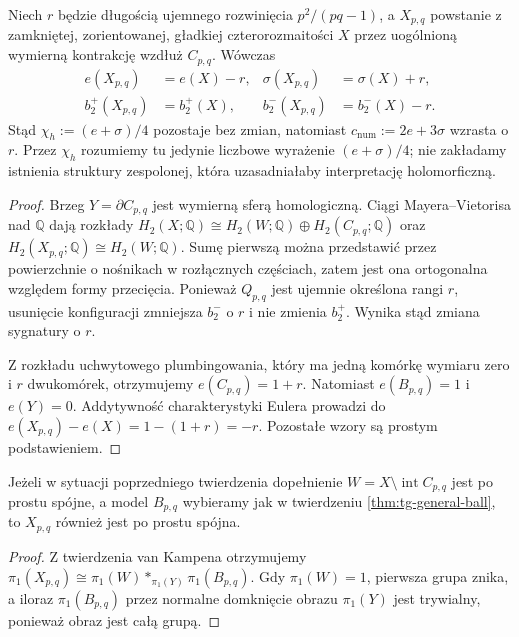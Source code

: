 \begin{twierdzenie}
\label{thm:tg-general-numeric}
Niech $r$ będzie długością ujemnego rozwinięcia
$p^2/(pq-1)$, a $X_{p,q}$ powstanie z zamkniętej,
zorientowanej, gładkiej czterorozmaitości $X$
przez uogólnioną wymierną kontrakcję wzdłuż $C_{p,q}$.
Wówczas
\[
\begin{aligned}
e(X_{p,q})&=e(X)-r,&
\sigma(X_{p,q})&=\sigma(X)+r,\\
b_2^+(X_{p,q})&=b_2^+(X),&
b_2^-(X_{p,q})&=b_2^-(X)-r.
\end{aligned}
\]
Stąd $\chi_h:=(e+\sigma)/4$ pozostaje bez zmian,
natomiast $c_{\mathrm{num}}:=2e+3\sigma$ wzrasta o $r$.
Przez $\chi_h$ rozumiemy tu jedynie liczbowe wyrażenie
$(e+\sigma)/4$; nie zakładamy istnienia struktury
zespolonej, która uzasadniałaby interpretację holomorficzną.
\end{twierdzenie}

\begin{proof}
Brzeg $Y=\partial C_{p,q}$ jest wymierną sferą homologiczną.
Ciągi Mayera--Vietorisa nad $\mathbb Q$ dają rozkłady
$H_2(X;\mathbb Q)\cong H_2(W;\mathbb Q)\oplus
H_2(C_{p,q};\mathbb Q)$ oraz
$H_2(X_{p,q};\mathbb Q)\cong H_2(W;\mathbb Q)$.
Sumę pierwszą można przedstawić przez powierzchnie o nośnikach
w rozłącznych częściach, zatem jest ona ortogonalna względem
formy przecięcia. Ponieważ $Q_{p,q}$ jest ujemnie określona
rangi $r$, usunięcie konfiguracji zmniejsza $b_2^-$ o $r$
i nie zmienia $b_2^+$. Wynika stąd zmiana sygnatury o $r$.

Z rozkładu uchwytowego plumbingowania, który ma jedną
komórkę wymiaru zero i $r$ dwukomórek, otrzymujemy
$e(C_{p,q})=1+r$. Natomiast $e(B_{p,q})=1$
i $e(Y)=0$. Addytywność charakterystyki Eulera prowadzi do
$e(X_{p,q})-e(X)=1-(1+r)=-r$.
Pozostałe wzory są prostym podstawieniem.
\end{proof}

\begin{wniosek}
Jeżeli w sytuacji poprzedniego twierdzenia dopełnienie
$W=X\setminus\operatorname{int}C_{p,q}$ jest po prostu spójne,
a model $B_{p,q}$ wybieramy jak w twierdzeniu
\ref{thm:tg-general-ball}, to $X_{p,q}$ również jest po prostu
spójna.
\end{wniosek}

\begin{proof}
Z twierdzenia van Kampena otrzymujemy
$\pi_1(X_{p,q})\cong\pi_1(W)*_{\pi_1(Y)}\pi_1(B_{p,q})$.
Gdy $\pi_1(W)=1$, pierwsza grupa znika, a iloraz
$\pi_1(B_{p,q})$ przez normalne domknięcie obrazu
$\pi_1(Y)$ jest trywialny, ponieważ obraz jest całą grupą.
\end{proof}

